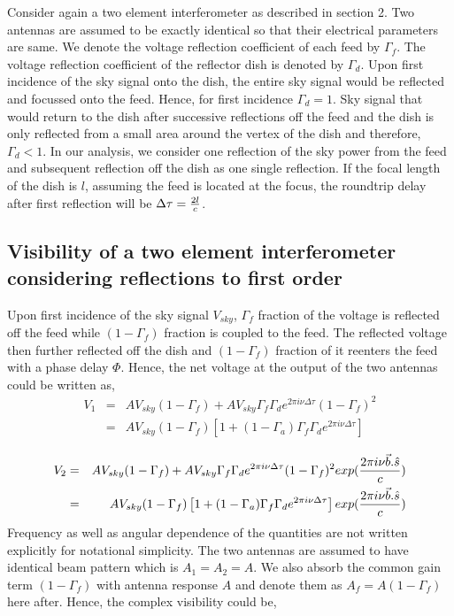\documentclass[12pt,preprint]{aastex}
\begin{document}
Consider again a two element interferometer as described in section 2. Two antennas are assumed to be exactly identical so that their electrical parameters are same. We denote the voltage reflection coefficient of each feed by $\Gamma_{f}$. The voltage reflection coefficient of the reflector dish is denoted by $\Gamma_{d}$. Upon first incidence of the sky signal onto the dish, the entire sky signal would be reflected and focussed onto the feed. Hence, for first incidence $\Gamma_{d}=1$. Sky signal that would return to the dish after successive reflections off the feed and the dish is only reflected from a small area around the vertex of the dish and therefore, $\Gamma_{d}<1$. In our analysis, we consider one reflection of the sky power from the feed and subsequent reflection off the dish as one single reflection. If the focal length of the dish is $l$, assuming the feed is located at the focus, the roundtrip delay after first reflection will be $\Delta \tau = {2l \over c}$. 


\subsection{Visibility of a two element interferometer considering reflections to first order}
Upon first incidence of the sky signal $V_{sky}$, $\Gamma_{f}$ fraction of the voltage is reflected off the feed while $(1-\Gamma_{f})$ fraction is coupled to the feed. The reflected voltage then further reflected off the dish and $(1-\Gamma_{f}) $ fraction of it reenters the feed with a phase delay $\Phi$. Hence, the net voltage at the output of the two antennas could be written as,    
\begin{eqnarray}
V_{1} & = & A V_{sky}(1-\Gamma_{f}) + A V_{sky} \Gamma_{f} \Gamma_{d} e^{2\pi i\nu \Delta \tau}  (1-\Gamma_{f})^{2}\nonumber\\
         & = & A V_{sky} (1-\Gamma_{f}) \left [ 1+ (1-\Gamma_{a})\Gamma_{f} \Gamma_{d} e^{2\pi i\nu \Delta \tau} \right]\nonumber\\
\label{eq4}
\end{eqnarray}
\begin{eqnarray}
V_{2} & = & A V_{sky}(1-\Gamma_{f}) + A V_{sky} \Gamma_{f} \Gamma_{d} e^{2\pi i\nu \Delta \tau} (1-\Gamma_{f})^{2}exp({2\pi i \nu \vec{b}.\hat{s} \over c} )\nonumber\\
         & = & A V_{sky} (1-\Gamma_{f}) \left [ 1+(1-\Gamma_{a}) \Gamma_{f} \Gamma_{d} e^{2\pi i\nu \Delta \tau}  \right]exp({2\pi i \nu \vec{b}.\hat{s} \over c} )\nonumber\\
\label{eq5}
\end{eqnarray}
Frequency as well as angular dependence of the quantities are not written explicitly for notational simplicity. 
The two antennas are assumed to have identical beam pattern which is $A_{1}=A_{2} =A$. We also absorb the common gain term $(1-\Gamma_{f})$ with antenna response $A$ and denote them as $A_{f}= A(1-\Gamma_{f})$ here after. Hence, the complex visibility could be, 
\end{document}
